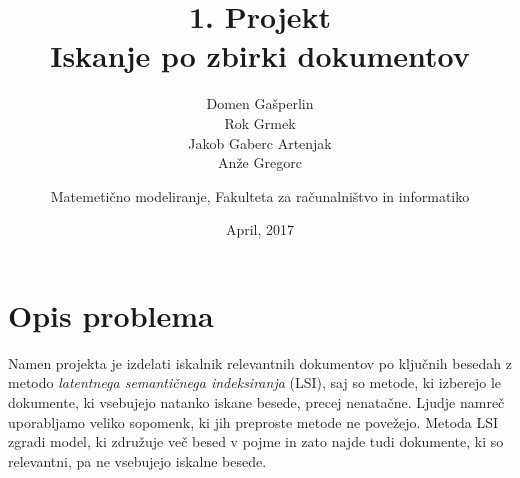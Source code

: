 \documentclass{article}
\begin{document}
\begin{titlepage}
\author{Domen Gašperlin\\Rok Grmek\\Jakob Gaberc Artenjak\\Anže Gregorc\and Matemetično modeliranje, Fakulteta za računalništvo in informatiko}
\title{\textbf{1. Projekt\\Iskanje po zbirki dokumentov}}
\date{April, 2017}

\maketitle
\begin{center}
\end{center}
\end{titlepage}

\section{Opis problema}
Namen projekta je izdelati iskalnik relevantnih dokumentov po ključnih besedah z metodo\textit{ latentnega semantičnega indeksiranja} (LSI), saj so metode, ki izberejo le dokumente, ki vsebujejo natanko iskane besede, precej nenatačne. Ljudje namreč uporabljamo veliko sopomenk, ki jih preproste metode ne povežejo. Metoda LSI zgradi model, ki združuje več besed v pojme in zato najde tudi dokumente, ki so relevantni, pa ne vsebujejo iskalne besede.
\end{document}
